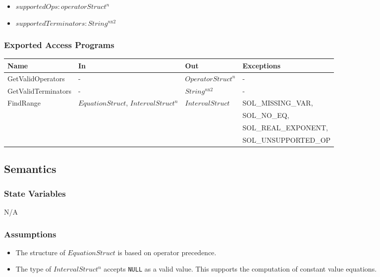 \documentclass[12pt, titlepage]{article}
\begin{document}
\begin{itemize}
	\item $supportedOps : operatorStruct^n$
	\item $supportedTerminators : String^{n\text{x}2}$
\end{itemize}

\subsubsection{Exported Access Programs}

\begin{center}
	\begin{tabular}{p{3.5cm} p{3cm} p{3cm} p{5cm}}
		\hline
		\textbf{Name} & \textbf{In} & \textbf{Out} & \textbf{Exceptions} \\
		\hline
		GetValidOperators & - & $OperatorStruct^n$ & -\\
		GetValidTerminators & - & $String^{n\text{x}2}$ & -\\
		\multirow{4}{3.1cm}{FindRange} & \multirow{4}{3cm}{$EquationStruct$, 
		$IntervalStruct^n$} & \multirow{4}{3cm}{$IntervalStruct$} & 
		SOL\_MISSING\_VAR, \\
		& & & SOL\_NO\_EQ, \\
		& & & SOL\_REAL\_EXPONENT, \\
		& & & SOL\_UNSUPPORTED\_OP \\
		\hline
	\end{tabular}
\end{center}

\subsection{Semantics}

\subsubsection{State Variables}

N/A

\subsubsection{Assumptions}

\begin{itemize}
	\item The structure of $EquationStruct$ is based on operator precedence.
	\item The type of $IntervalStruct^n$ accepts \texttt{NULL} as a valid 
	value. This supports the computation of constant value equations.
\end{itemize}
\end{document}
